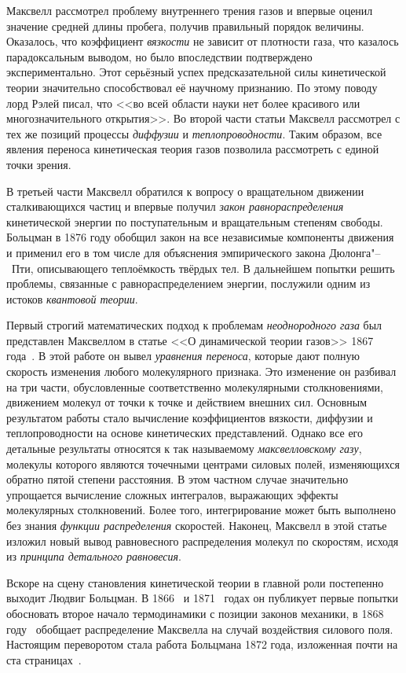 \documentclass[a4paper, 12pt, oneside]{article} %
\begin{document}
Максвелл рассмотрел проблему внутреннего трения газов и впервые оценил
значение средней длины пробега, получив правильный порядок величины.
Оказалось, что коэффициент \emph{вязкости} не зависит от плотности газа,
что казалось парадоксальным выводом, но было впоследствии подтверждено
экспериментально. Этот серьёзный успех предсказательной силы
кинетической теории значительно способствовал её научному признанию. По
этому поводу лорд Рэлей писал, что <<во всей области науки нет более
красивого или многозначительного открытия>>. Во второй части статьи
Максвелл рассмотрел с тех же позиций процессы \emph{диффузии} и
\emph{теплопроводности}. Таким образом, все явления переноса
кинетическая теория газов позволила рассмотреть с единой точки зрения.

В третьей части Максвелл обратился к вопросу о вращательном движении
сталкивающихся частиц и впервые получил \emph{закон равнораспределения}
кинетической энергии по поступательным и вращательным степеням свободы.
Больцман в 1876 году обобщил закон на все независимые компоненты
движения и применил его в том числе для объяснения эмпирического закона
Дюлонга"--~Пти, описывающего теплоёмкость твёрдых тел. В дальнейшем
попытки решить проблемы, связанные с равнораспределением энергии,
послужили одним из истоков \emph{квантовой теории}.

Первый строгий математических подход к проблемам \emph{неоднородного
газа} был представлен Максвеллом в статье <<О динамической теории
газов>> 1867 года~\cite{maxwell2012theory}. В этой работе он вывел
\emph{уравнения переноса}, которые дают полную скорость изменения любого
молекулярного признака. Это изменение он разбивал на три части,
обусловленные соответственно молекулярными столкновениями, движением
молекул от точки к точке и действием внешних сил. Основным результатом
работы стало вычисление коэффициентов вязкости, диффузии и
теплопроводности на основе кинетических представлений. Однако все его
детальные результаты относятся к так называемому \emph{максвелловскому
газу}, молекулы которого являются точечными центрами силовых полей,
изменяющихся обратно пятой степени расстояния. В этом частном случае
значительно упрощается вычисление сложных интегралов, выражающих эффекты
молекулярных столкновений. Более того, интегрирование может быть
выполнено без знания \emph{функции распределения }скоростей. Наконец,
Максвелл в этой статье изложил новый вывод равновесного распределения
молекул по скоростям, исходя из \emph{принципа детального равновесия}.

Вскоре на сцену становления кинетической теории в главной роли
постепенно выходит Людвиг Больцман. В 1866~\cite{boltzmann1866second} и
1871~\cite{boltzmann1871equilibrium} годах он публикует первые попытки
обосновать второе начало термодинамики с позиции законов механики, в
1868 году~\cite{boltzmann1868distribution} обобщает распределение
Максвелла на случай воздействия силового поля. Настоящим переворотом
стала работа Больцмана 1872 года, изложенная почти на ста
страницах~\cite{boltzmann1872further}.
\end{document}
